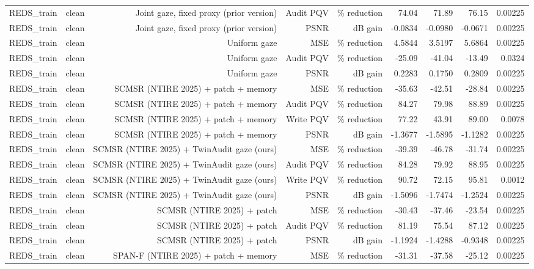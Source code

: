 \begin{table}[t]
\begin{tabular}{llrrrrrrr}
REDS\_train & clean & Joint gaze, fixed proxy (prior version) & Audit PQV & \% reduction & 74.04 & 71.89 & 76.15 & 0.00225 \\
REDS\_train & clean & Joint gaze, fixed proxy (prior version) & PSNR & dB gain & -0.0834 & -0.0980 & -0.0671 & 0.00225 \\
REDS\_train & clean & Uniform gaze & MSE & \% reduction & 4.5844 & 3.5197 & 5.6864 & 0.00225 \\
REDS\_train & clean & Uniform gaze & Audit PQV & \% reduction & -25.09 & -41.04 & -13.49 & 0.0324 \\
REDS\_train & clean & Uniform gaze & PSNR & dB gain & 0.2283 & 0.1750 & 0.2809 & 0.00225 \\
REDS\_train & clean & SCMSR (NTIRE 2025) + patch + memory & MSE & \% reduction & -35.63 & -42.51 & -28.84 & 0.00225 \\
REDS\_train & clean & SCMSR (NTIRE 2025) + patch + memory & Audit PQV & \% reduction & 84.27 & 79.98 & 88.89 & 0.00225 \\
REDS\_train & clean & SCMSR (NTIRE 2025) + patch + memory & Write PQV & \% reduction & 77.22 & 43.91 & 89.00 & 0.0078 \\
REDS\_train & clean & SCMSR (NTIRE 2025) + patch + memory & PSNR & dB gain & -1.3677 & -1.5895 & -1.1282 & 0.00225 \\
REDS\_train & clean & SCMSR (NTIRE 2025) + TwinAudit gaze (ours) & MSE & \% reduction & -39.39 & -46.78 & -31.74 & 0.00225 \\
REDS\_train & clean & SCMSR (NTIRE 2025) + TwinAudit gaze (ours) & Audit PQV & \% reduction & 84.28 & 79.92 & 88.95 & 0.00225 \\
REDS\_train & clean & SCMSR (NTIRE 2025) + TwinAudit gaze (ours) & Write PQV & \% reduction & 90.72 & 72.15 & 95.81 & 0.0012 \\
REDS\_train & clean & SCMSR (NTIRE 2025) + TwinAudit gaze (ours) & PSNR & dB gain & -1.5096 & -1.7474 & -1.2524 & 0.00225 \\
REDS\_train & clean & SCMSR (NTIRE 2025) + patch & MSE & \% reduction & -30.43 & -37.46 & -23.54 & 0.00225 \\
REDS\_train & clean & SCMSR (NTIRE 2025) + patch & Audit PQV & \% reduction & 81.19 & 75.54 & 87.12 & 0.00225 \\
REDS\_train & clean & SCMSR (NTIRE 2025) + patch & PSNR & dB gain & -1.1924 & -1.4288 & -0.9348 & 0.00225 \\
REDS\_train & clean & SPAN-F (NTIRE 2025) + patch + memory & MSE & \% reduction & -31.31 & -37.58 & -25.12 & 0.00225 \\

\end{tabular}
\end{table}
